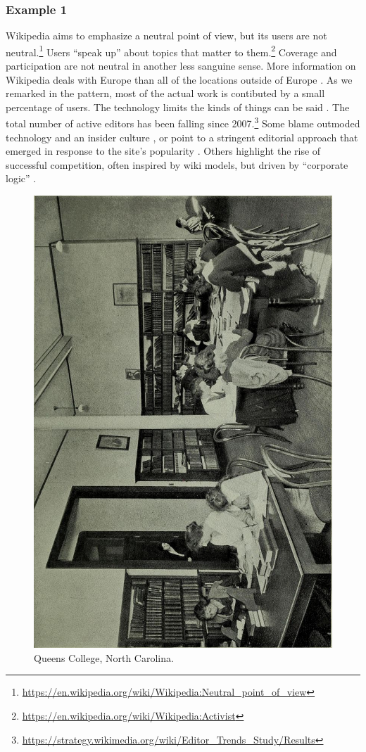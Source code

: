 

\subsubsection*{Example 1}
Wikipedia aims to emphasize a neutral point of view, but its users are
not neutral.\footnote{\url{https://en.wikipedia.org/wiki/Wikipedia:Neutral_point_of_view}}
Users ``speak up'' about topics that matter to them.\footnote{\url{https://en.wikipedia.org/wiki/Wikipedia:Activist}}
Coverage and participation are not neutral in another less sanguine sense.
More information on Wikipedia deals with Europe than
all of the locations outside of Europe \citep{graham2014uneven}.
As we remarked in the  pattern, most of the
actual work is contibuted by a small percentage of users.
%
The technology limits the kinds of things can be said \cite{graham2014uneven}. 
%
The total number of active editors has been falling since
2007.\footnote{\url{https://strategy.wikimedia.org/wiki/Editor_Trends_Study/Results}}
Some blame outmoded technology and an insider culture
\cite{simonite2013decline}, or point to a stringent editorial
approach that emerged in response to the site's popularity
\cite{halfaker13rise}.  Others highlight the rise of successful competition, often inspired by wiki models, but driven by ``corporate logic'' \cite{kreiss2011limits,morellintroductory}.

\begin{figure}
\vspace{-.6cm}
\begin{center}
\includegraphics[width=.3\textwidth,angle=-90,trim=0 0 10 10, clip=true]{ladies-hall}
\end{center}
\vspace{-.5cm}
\caption{Queens College, North Carolina.
\label{ladies-hall}}
\vspace{-.3cm}
\end{figure}

